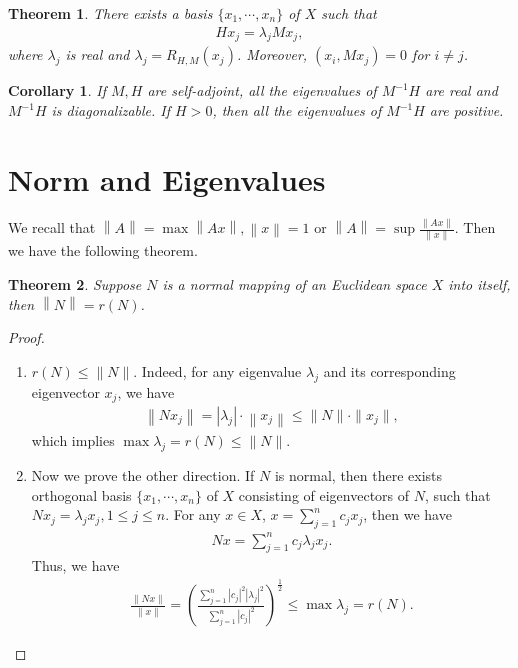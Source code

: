 \documentclass[10pt]{book}
\newtheorem{theorem}{Theorem}[chapter]
\newtheorem{corollary}{Corollary}[theorem]
\theoremstyle{definition}
\numberwithin{equation}{chapter}
\begin{document}
\medskip

\begin{theorem}
There exists a basis $\{x_1,\cdots,x_n\}$ of $X$ such that 
\begin{align*}
    Hx_j = \lambda_j M x_j, 
\end{align*}
where $\lambda_j$ is real and $\lambda_j = R_{H,M}(x_j)$. Moreover, $\left(x_i, Mx_j\right) = 0$ for $i\neq j$.
\end{theorem}

\medskip

\begin{corollary}
If $M,H$ are self-adjoint, all the eigenvalues of $M^{-1}H$ are real and $M^{-1}H$ is diagonalizable. If $H > 0$, then all the eigenvalues of $M^{-1}H$ are positive.
\end{corollary}

\medskip

\section{Norm and Eigenvalues}

We recall that $\left\|A\right\| = \max \left\|Ax\right\|, \left\|x\right\|=1$ or $\left\|A\right\| = \sup\frac{\|Ax\|}{\|x\|}$. Then we have the following theorem.

\medskip

\begin{theorem}
Suppose $N$ is a normal mapping of an Euclidean space $X$ into itself, then $\left\|N\right\| = r(N)$.
\end{theorem}
\begin{proof}
~\begin{enumerate}[label=(\alph*)]
    \item $r(N)\leq \|N\|$. Indeed, for any eigenvalue $\lambda_j$ and its corresponding eigenvector $x_j$, we have \begin{align*}
        \left\|Nx_j\right\| = |\lambda_j|\cdot \left\|x_j\right\|\leq \|N\|\cdot \|x_j\|,
    \end{align*}
    which implies $\max \lambda_j = r(N) \leq \|N\|$.
    \item Now we prove the other direction. If $N$ is normal, then there exists orthogonal basis $\{x_1,\cdots, x_n\}$ of $X$ consisting of eigenvectors of $N$, such that $Nx_j = \lambda_j x_j, 1\leq j\leq n$. For any $x\in X$, $x = \sum^n_{j=1}c_j x_j$, then we have
    \begin{align*}
        Nx = \sum^n_{j=1}c_j\lambda_j x_j.
    \end{align*}
    Thus, we have
    \begin{align*}
        \frac{\|Nx\|}{\|x\|} = \left(\frac{\sum^n_{j=1} |c_j|^2 |\lambda_j|^2}{\sum^n_{j=1} |c_j|^2}\right)^{\frac{1}{2}} \leq \max \lambda_j = r(N).
    \end{align*}
\end{enumerate}
\end{proof}
\end{document}
